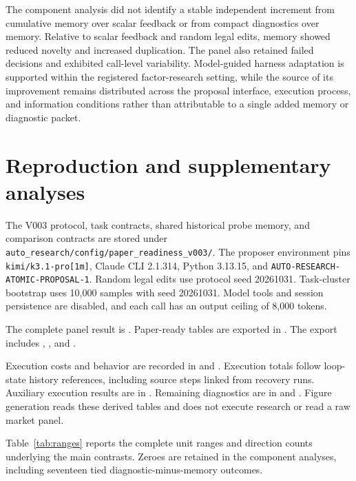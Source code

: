 The component analysis did not identify a stable independent increment from cumulative memory over scalar feedback or from compact diagnostics over memory. Relative to scalar feedback and random legal edits, memory showed reduced novelty and increased duplication. The panel also retained failed decisions and exhibited call-level variability. Model-guided harness adaptation is supported within the registered factor-research setting, while the source of its improvement remains distributed across the proposal interface, execution process, and information conditions rather than attributable to a single added memory or diagnostic packet.

\appendix
\section{Reproduction and supplementary analyses}
\label{app:reproduction}

The V003 protocol, task contracts, shared historical probe memory, and comparison contracts are stored under \texttt{auto\_research/config/paper\_readiness\_v003/}. The proposer environment pins \texttt{kimi/k3.1-pro[1m]}, Claude CLI 2.1.314, Python 3.13.15, and \texttt{AUTO-RESEARCH-ATOMIC-PROPOSAL-1}. Random legal edits use protocol seed 20261031. Task-cluster bootstrap uses 10{,}000 samples with seed 20261031. Model tools and session persistence are disabled, and each call has an output ceiling of 8{,}000 tokens.

The complete panel result is . Paper-ready tables are exported in . The export includes , , and .

Execution costs and behavior are recorded in  and . Execution totals follow loop-state history references, including source steps linked from recovery runs. Auxiliary execution results are in . Remaining diagnostics are in  and . Figure generation reads these derived tables and does not execute research or read a raw market panel.

Table~\ref{tab:ranges} reports the complete unit ranges and direction counts underlying the main contrasts. Zeroes are retained in the component analyses, including seventeen tied diagnostic-minus-memory outcomes.

